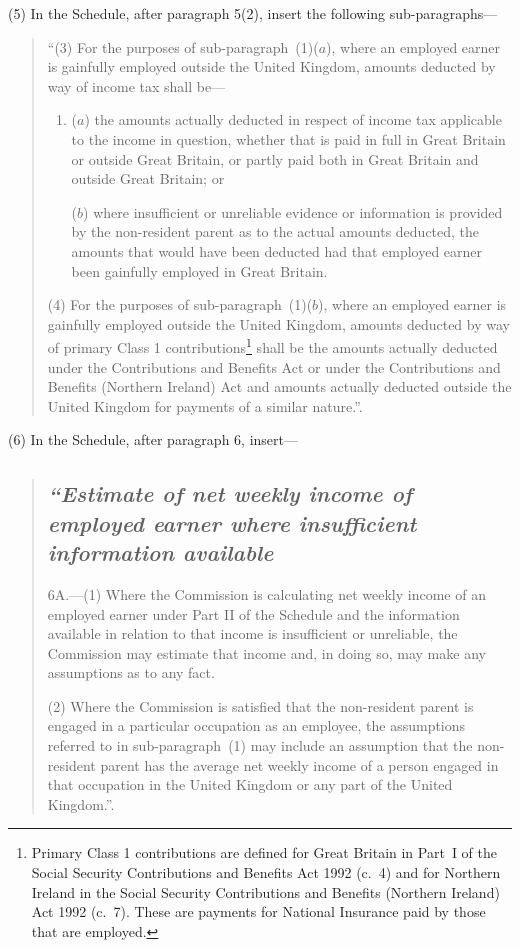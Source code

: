 \documentclass[12pt,a4paper]{article}
\begin{document}
(5) In the Schedule, after paragraph 5(2), insert the following sub-paragraphs—
\begin{quotation}
“(3) For the purposes of sub-paragraph~(1)($a$), where an employed earner is gainfully employed outside the United Kingdom, amounts deducted by way of income tax shall be---
\begin{enumerate}\item[]
($a$) the amounts actually deducted in respect of income tax applicable to the income in question, whether that is paid in full in Great Britain or outside Great Britain, or partly paid both in Great Britain and outside Great Britain; or

($b$) where insufficient or unreliable evidence or information is provided by the non-resident parent as to the actual amounts deducted, the amounts that would have been deducted had that employed earner been gainfully employed in Great Britain.
\end{enumerate}

(4) For the purposes of sub-paragraph~(1)($b$), where an employed earner is gainfully employed outside the United Kingdom, amounts deducted by way of primary Class 1 contributions\footnote{Primary Class 1 contributions are defined for Great Britain in Part~I of the Social Security Contributions and Benefits Act 1992 (c.~4) and for Northern Ireland in the Social Security Contributions and Benefits (Northern Ireland) Act 1992 (c.~7). These are payments for National Insurance paid by those that are employed.} shall be the amounts actually deducted under the Contributions and Benefits Act or under the Contributions and Benefits (Northern Ireland) Act and amounts actually deducted outside the United Kingdom for payments of a similar nature.”.
\end{quotation}

(6) In the Schedule, after paragraph 6, insert—
\begin{quotation}
\subsection*{\sloppy\itshape “Estimate of net weekly income of employed earner where insufficient information available}

6A.---(1)  Where the Commission is calculating net weekly income of an employed earner under Part II of the Schedule and the information available in relation to that income is insufficient or unreliable, the Commission may estimate that income and, in doing so, may make any assumptions as to any fact.

(2) Where the Commission is satisfied that the non-resident parent is engaged in a particular occupation as an employee, the assumptions referred to in sub-paragraph~(1) may include an assumption that the non-resident parent has the average net weekly income of a person engaged in that occupation in the United Kingdom or any part of the United Kingdom.”.
\end{quotation}
\end{document}

